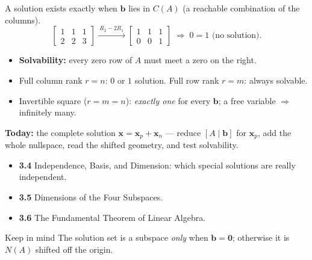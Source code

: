 \documentclass[aspectratio=169, 11pt]{beamer}
\newcommand{\xx}{\mathbf{x}}
\newcommand{\bb}{\mathbf{b}}
\newcommand{\zero}{\mathbf{0}}
\begin{document}
\begin{frame}[t, plain]
  \burgundyheader{Is $A\xx=\bb$ even solvable?}
  A solution exists exactly when $\bb$ lies in $C(A)$ (a reachable combination of the columns).
  \[
    \left[\begin{array}{cc|c} 1 & 1 & 1 \\ 2 & 2 & 3 \end{array}\right]
    \xrightarrow{\;R_2-2R_1\;}
    \left[\begin{array}{cc|c} 1 & 1 & 1 \\ 0 & 0 & 1 \end{array}\right]
    \;\Rightarrow\; 0=1 \text{ (no solution).}
  \]
  \begin{itemize}
    \setlength{\itemsep}{4pt}
    \item \textbf{Solvability:} every zero row of $A$ must meet a zero on the right.
    \item Full column rank $r=n$: $0$ or $1$ solution. \quad Full row rank $r=m$: always solvable.
    \item Invertible square ($r=m=n$): \emph{exactly one} for every $\bb$; a free variable $\Rightarrow$ infinitely many.
  \end{itemize}
\end{frame}

\begin{frame}[t, plain]
  \textbf{Today:} the complete solution $\xx=\xx_p+\xx_n$ --- reduce $[A\mid\bb]$ for $\xx_p$, add the
  whole nullspace, read the shifted geometry, and test solvability.\\[8pt]
  \begin{itemize}
    \setlength{\itemsep}{4pt}
    \item \textbf{3.4} Independence, Basis, and Dimension: which special solutions are really independent.
    \item \textbf{3.5} Dimensions of the Four Subspaces.
    \item \textbf{3.6} The Fundamental Theorem of Linear Algebra.
  \end{itemize}
  \vspace{4pt}
  \begin{block}{Keep in mind}
    The solution set is a subspace \emph{only} when $\bb=\zero$; otherwise it is $N(A)$ shifted off the origin.
  \end{block}
\end{frame}
\end{document}
